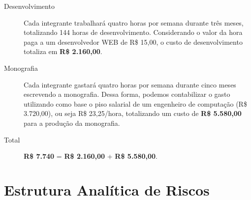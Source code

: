 \documentclass[]{article}
\begin{document}
\begin{description}
  \item[Desenvolvimento]
  
  Cada integrante trabalhará quatro horas por semana durante três meses, totalizando 144 horas de desenvolvimento. Considerando o valor da hora paga a um desenvolvedor WEB de R\$ 15,00, o custo de desenvolvimento totaliza em \textbf{R\$ 2.160,00}.
  
  \item[Monografia] 
  
  Cada integrante gastará quatro horas por semana durante cinco meses escrevendo a monografia. Dessa forma, podemos contabilizar o gasto utilizando como base o piso salarial de um engenheiro de computação (R\$ 3.720,00), ou seja R\$ 23,25/hora, totalizando um custo de \textbf{R\$ 5.580,00} para a produção da monografia.
  
  \item[Total] \textbf{R\$ 7.740} = \textbf{R\$ 2.160,00} + \textbf{R\$ 5.580,00}.
  
  
\end{description}



\section{Estrutura Analítica de Riscos} %
\label{sec:estrutura_analitica_de_riscos}
\end{document}
